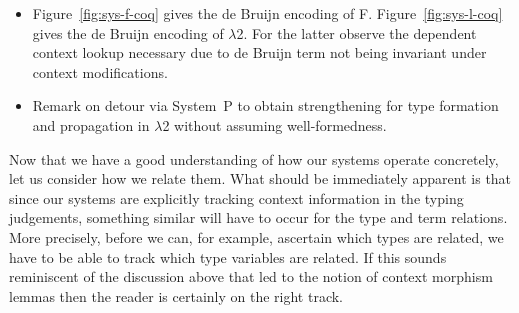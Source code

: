 \documentclass[a4paper,UKenglish]{lipics-v2016}
\newcommand{\SysL}{$\lambda$2\xspace}
\begin{document}
\begin{itemize}
\item Figure~\ref{fig:sys-f-coq} gives the de Bruijn encoding of F.
  Figure~\ref{fig:sys-l-coq} gives the de Bruijn encoding of \SysL.
  For the latter observe the dependent context lookup necessary due to de Bruijn term not being invariant under context modifications.
\item Remark on detour via System~P to obtain strengthening for type formation and propagation in \SysL without assuming well-formedness.
\end{itemize}

Now that we have a good understanding of how our systems operate concretely, let us consider how we relate them.
What should be immediately apparent is that since our systems are explicitly tracking context information in the typing judgements, something similar will have to occur for the type and term relations.
More precisely, before we can, for example, ascertain which types are related, we have to be able to track which type variables are related.
If this sounds reminiscent of the discussion above that led to the notion of context morphism lemmas then the reader is certainly on the right track.
\end{document}
